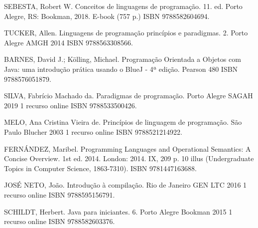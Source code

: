 \footnotesize
\noindent SEBESTA, Robert W. Conceitos de linguagens de programação. 11. ed. Porto Alegre, RS: Bookman, 2018. E-book (757 p.) ISBN 9788582604694. 

\noindent TUCKER, Allen. Linguagens de programação princípios e paradigmas. 2. Porto Alegre AMGH 2014 ISBN 9788563308566.

\noindent BARNES, David J.; Kölling, Michael. Programação Orientada a Objetos com Java: uma introdução prática usando o BlueJ - 4ª edição. Pearson 480 ISBN 9788576051879.

\noindent SILVA, Fabrício Machado da. Paradigmas de programação. Porto Alegre SAGAH 2019 1 recurso online ISBN 9788533500426. 

\noindent MELO, Ana Cristina Vieira de. Princípios de linguagem de programação. São Paulo Blucher 2003 1 recurso online ISBN 9788521214922.

\noindent FERNÁNDEZ, Maribel. Programming Languages and Operational Semantics: A Concise Overview. 1st ed. 2014. London: 2014. IX, 209 p. 10 illus (Undergraduate Topics in Computer Science, 1863-7310). ISBN 9781447163688. 

\noindent JOSÉ NETO, João. Introdução à compilação. Rio de Janeiro GEN LTC 2016 1 recurso online ISBN 9788595156791.

\noindent SCHILDT, Herbert. Java para iniciantes. 6. Porto Alegre Bookman 2015 1 recurso online ISBN 9788582603376. 


